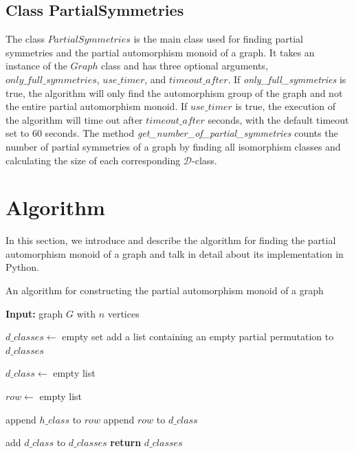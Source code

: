\subsection{Class PartialSymmetries}

The class $PartialSymmetries$ is the main class used for finding partial symmetries and the partial automorphism monoid of a graph. It takes an instance of the $Graph$ class and has three optional arguments, $only\_full\_symmetries$, $use\_timer$, and $timeout\_after$. If \emph{only\_full\_symmetries} is true, the algorithm will only find the automorphism group of the graph and not the entire partial automorphism monoid. If $use\_timer$ is true, the execution of the algorithm will time out after $timeout\_after$ seconds, with the default timeout set to 60 seconds. The method \emph{get\_number\_of\_partial\_symmetries} counts the number of partial symmetries of a graph by finding all isomorphism classes and calculating the size of each corresponding $\mathcal{D}$-class.

\section{Algorithm}
\label{sec:alg}

In this section, we introduce and describe the algorithm for finding the partial automorphism monoid of a graph and talk in detail about its implementation in Python.

\begin{algorithm}
\caption{An algorithm for constructing the partial automorphism monoid of a graph}\label{alg:dclasses}
\begin{algorithmic}[1]
\State \textbf{Input:} graph $G$ with $n$ vertices

\State $d\_classes \gets$ empty set
\State add a list containing an empty partial permutation to $d\_classes$
\Else
{}

\State $d\_class \gets$ empty list \label{line:dclass_start}

\State $row \gets$ empty list


\State append $h\_class$ to $row$
\EndFor
\State append $row$ to $d\_class$
\EndFor

\State add $d\_class$ to $d\_classes$ \label{line:dclass_end}
\EndFor
\EndIf
\EndFor
\State \textbf{return} $d\_classes$
\end{algorithmic}
\end{algorithm}

